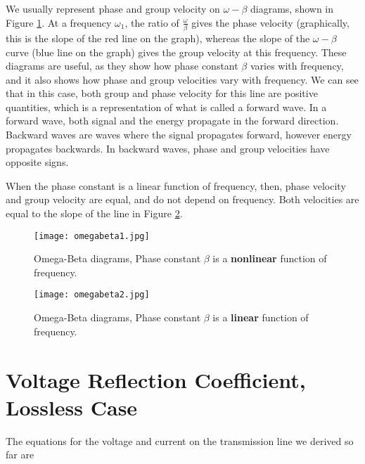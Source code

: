 \documentclass{ximera}
\begin{document}
\begin{itemize}
We usually represent phase and group velocity on $\omega-\beta$ diagrams, shown in Figure \ref{omegabeta1}. At a frequency $\omega_1$, the ratio of $\frac{\omega}{\beta}$ gives the phase velocity (graphically, this is the slope of the red line on the graph), whereas the slope of the $\omega-\beta$ curve (blue line on the graph) gives the group velocity at this frequency. These diagrams are useful, as they show how phase constant $\beta$ varies with frequency, and it also shows how phase and group velocities vary with frequency. We can see that in this case, both group and phase velocity for this line are positive quantities, which is a representation of what is called a forward wave. In a forward wave, both signal and the energy propagate in the forward direction. Backward waves are waves where the signal propagates forward, however energy propagates backwards. In backward waves, phase and group velocities have opposite signs.  

When the phase constant is a linear function of frequency, then, phase velocity and group velocity are equal, and do not depend on frequency. Both velocities are equal to the slope of the line in Figure \ref{omegabeta2}.

\begin{figure}[htbp]
\begin{center}
\texttt{[image: omegabeta1.jpg]}
\caption{Omega-Beta diagrams, Phase constant $\beta$ is a {\bf nonlinear} function of frequency.}\label{omegabeta1}
\end{center}
\end{figure}


\begin{figure}[htbp]
\begin{center}
\texttt{[image: omegabeta2.jpg]}
\caption{Omega-Beta diagrams, Phase constant $\beta$ is a {\bf linear} function of frequency.}\label{omegabeta2}
\end{center}
\end{figure}


\end{itemize}




\section{Voltage Reflection Coefficient, Lossless Case}

The equations for the voltage and current on the transmission line we
derived so far are
\end{document}
